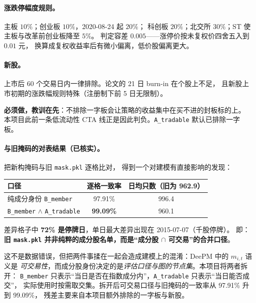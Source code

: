 \documentclass[11pt, a4paper]{ctexart}
\newcommand{\file}[1]{\texttt{\small #1}}
\begin{document}
\paragraph{涨跌停幅度规则。}主板 $10\%$；创业板 $10\%$，2020-08-24 起 $20\%$；
科创板 $20\%$；北交所 $30\%$；ST 使主板与改革前创业板降至 $5\%$。
判定容差 $0.005$——涨停价按未复权价四舍五入到 $0.01$ 元，
换算成复权收益率后有微小偏离，低价股偏离更大。

\paragraph{新股。}上市后 60 个交易日内一律排除。论文的 21 日 burn-in 在个股上不足，
且新股上市初期的涨跌幅规则特殊（注册制下前 5 日无限制）。

\begin{warnbox}
\textbf{必须做，教训在先}：不排除一字板会让策略的收益集中在买不进的封板标的上。
本项目此前一条低流动性 CTA 线正是因此判负。\file{A\_tradable} 默认已排除一字板。
\end{warnbox}

\paragraph{与旧掩码的对表结果（已核实）。}把新构掩码与旧 \file{mask.pkl} 逐格比对，
得到一个对建模有直接影响的发现：

\begin{table}[h]
\centering
\small
\begin{tabular}{lcc}
\toprule
口径 & 逐格一致率 & 日均只数（旧为 962.9） \\
\midrule
纯成分身份 \file{B\_member} & 97.91\% & 996.4 \\
\file{B\_member} $\wedge$ \file{A\_tradable} & \textbf{99.09\%} & 960.1 \\
\bottomrule
\end{tabular}
\end{table}

\noindent
差异格子中 \textbf{72\% 是停牌日}，单日最大差异出现在 2015-07-07（千股停牌）。
即：\textbf{旧 \file{mask.pkl} 并非纯粹的成分股名单，而是“成分股 $\cap$ 可交易”的合并口径}。

这不是数据错误，但把两件事揉在一起会造成建模上的混淆：DeePM 中的 $m_{i,t}$ 语义是
\emph{可交易性}，而成分股身份决定的是\emph{评估口径与图的节点集}。本项目将两者拆开：
\file{B\_member} 只表示“当日是否在指数成分内”，\file{A\_tradable} 只表示“当日能否成交”，
实际使用时按需取交集。拆开后可交易口径与旧掩码的一致率从 97.91\% 升到 99.09\%，
残差主要来自本项目额外排除的一字板与新股。
\end{document}
